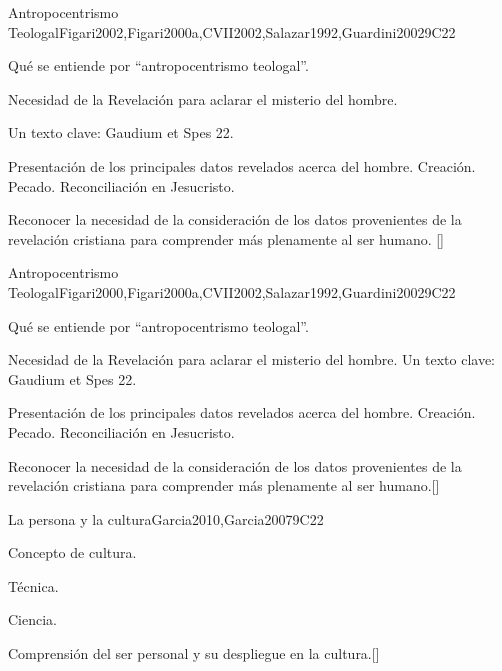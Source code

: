 \begin{syllabus}
\begin{unit}{}{Antropocentrismo Teologal}{Figari2002,Figari2000a,CVII2002,Salazar1992,Guardini2002}{9}{C22}
\begin{topics}
 	 \item Qué se entiende por ``antropocentrismo teologal''.
	 \item Necesidad de la Revelación para aclarar el misterio del hombre. 
	 \item Un texto clave: Gaudium et Spes 22.
	 \item Presentación de los principales datos revelados acerca del hombre.
		\subitem Creación.
		\subitem Pecado.
		\subitem Reconciliación en Jesucristo.
\end{topics}
\begin{learningoutcomes}
	\item Reconocer la necesidad de la consideración de los datos provenientes de la revelación cristiana para comprender más plenamente al ser humano. [\Usage]
\end{learningoutcomes}
\end{unit}

\begin{unit}{}{Antropocentrismo Teologal}{Figari2000,Figari2000a,CVII2002,Salazar1992,Guardini2002}{9}{C22}
\begin{topics}
 	 \item Qué se entiende por ``antropocentrismo teologal''.
	 \item Necesidad de la Revelación para aclarar el misterio del hombre. 
		\subitem Un texto clave: Gaudium et Spes 22.
	 \item Presentación de los principales datos revelados acerca del hombre.
		\subitem Creación.
		\subitem Pecado.
		\subitem Reconciliación en Jesucristo.
\end{topics}
\begin{learningoutcomes}
	\item Reconocer la necesidad de la consideración de los datos provenientes de la revelación cristiana para comprender más plenamente al ser humano.[\Usage]
\end{learningoutcomes}
\end{unit}

\begin{unit}{}{La persona y la cultura}{Garcia2010,Garcia2007}{9}{C22}
\begin{topics}
 	 \item Concepto de cultura.
	 \item Técnica.
	 \item Ciencia.
\end{topics}
\begin{learningoutcomes}
	\item Comprensión del ser personal y su despliegue en la cultura.[\Usage]
\end{learningoutcomes}
\end{unit}

\begin{coursebibliography}
\end{coursebibliography}

\end{syllabus}
